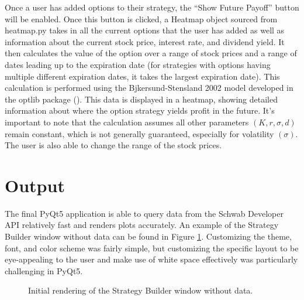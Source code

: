 \documentclass{article}
\begin{document}
\indent Once a user has added options to their strategy, the \enquote{Show Future Payoff} button will be enabled. Once this button is clicked, a Heatmap object sourced from heatmap.py takes in all the current options that the user has added as well as information about the current stock price, interest rate, and dividend yield. It then calculates the value of the option over a range of stock prices and a range of dates leading up to the expiration date (for strategies with options having multiple different expiration dates, it takes the largest expiration date). This calculation is performed using the Bjkersund-Stensland 2002 model developed in the optlib package (\cite{optlib}). This data is displayed in a heatmap, showing detailed information about where the option strategy yields profit in the future. It's important to note that the calculation assumes all other parameters $(K, r, \sigma, d)$ remain constant, which is not generally guaranteed, especially for volatility $(\sigma)$. The user is also able to change the range of the stock prices. 



\section{Output}

\indent The final PyQt5 application is able to query data from the Schwab Developer API relatively fast and renders plots accurately. An example of the Strategy Builder window without data can be found in Figure \ref{fig:Figure 7}. Customizing the theme, font, and color scheme was fairly simple, but customizing the specific layout to be eye-appealing to the user and make use of white space effectively was particularly challenging in PyQt5. 

\begin{figure}[htbp]
    \centering
    \caption{\label{fig:Figure 7}Initial rendering of the Strategy Builder window without data.}
\end{figure}
\end{document}
